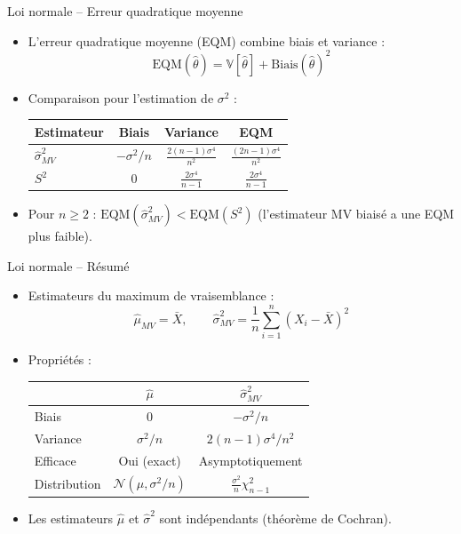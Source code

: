 \documentclass[11pt,aspectratio=169]{beamer}
\begin{document}
\begin{frame}{Loi normale -- Erreur quadratique moyenne}

\begin{itemize}

\item L'erreur quadratique moyenne (EQM) combine biais et variance :
  \[
  \text{EQM}(\hat{\theta}) = \mathbb{V}[\hat{\theta}] + \text{Biais}(\hat{\theta})^2
  \]

\item Comparaison pour l'estimation de $\sigma^2$ :
  \begin{center}
  \begin{tabular}{lccc}
  \hline
  Estimateur & Biais & Variance & EQM \\
  \hline
  $\hat{\sigma}^2_{MV}$ & $-\sigma^2/n$ & $\frac{2(n-1)\sigma^4}{n^2}$ & $\frac{(2n-1)\sigma^4}{n^2}$ \\[0.5em]
  $S^2$ & $0$ & $\frac{2\sigma^4}{n-1}$ & $\frac{2\sigma^4}{n-1}$ \\[0.3em]
  \hline
  \end{tabular}
  \end{center}

\item Pour $n \geq 2$ : $\text{EQM}(\hat{\sigma}^2_{MV}) < \text{EQM}(S^2)$ (l'estimateur MV biaisé a une EQM plus faible).

\end{itemize}

\end{frame}

\begin{frame}{Loi normale -- Résumé}

\begin{itemize}

\item Estimateurs du maximum de vraisemblance :
  \[
  \hat{\mu}_{MV} = \bar{X}, \qquad \hat{\sigma}^2_{MV} = \frac{1}{n}\sum_{i=1}^n(X_i - \bar{X})^2
  \]

\item Propriétés :
  \begin{center}
  \begin{tabular}{lcc}
  \hline
  & $\hat{\mu}$ & $\hat{\sigma}^2_{MV}$ \\
  \hline
  Biais & 0 & $-\sigma^2/n$ \\
  Variance & $\sigma^2/n$ & $2(n-1)\sigma^4/n^2$ \\
  Efficace & Oui (exact) & Asymptotiquement \\
  Distribution & $\mathcal{N}(\mu, \sigma^2/n)$ & $\frac{\sigma^2}{n}\chi^2_{n-1}$ \\
  \hline
  \end{tabular}
  \end{center}

\item Les estimateurs $\hat{\mu}$ et $\hat{\sigma}^2$ sont indépendants (théorème de Cochran).

\end{itemize}

\end{frame}
\end{document}
